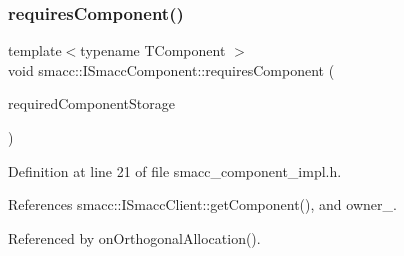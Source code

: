 \mbox{\label{classsmacc_1_1ISmaccComponent_aa06d58b1dcec3c513ca2edddfd3847ec}} 
\subsubsection{\texorpdfstring{requires\+Component()}{requiresComponent()}}
{\footnotesize\ttfamily template$<$typename T\+Component $>$ \\
void smacc\+::\+I\+Smacc\+Component\+::requires\+Component (\begin{DoxyParamCaption}\item[{T\+Component $\ast$\&}]{required\+Component\+Storage }\end{DoxyParamCaption})\hspace{0.3cm}{\ttfamily [protected]}}



Definition at line 21 of file smacc\+\_\+component\+\_\+impl.\+h.



References smacc\+::\+I\+Smacc\+Client\+::get\+Component(), and owner\+\_\+.



Referenced by on\+Orthogonal\+Allocation().


